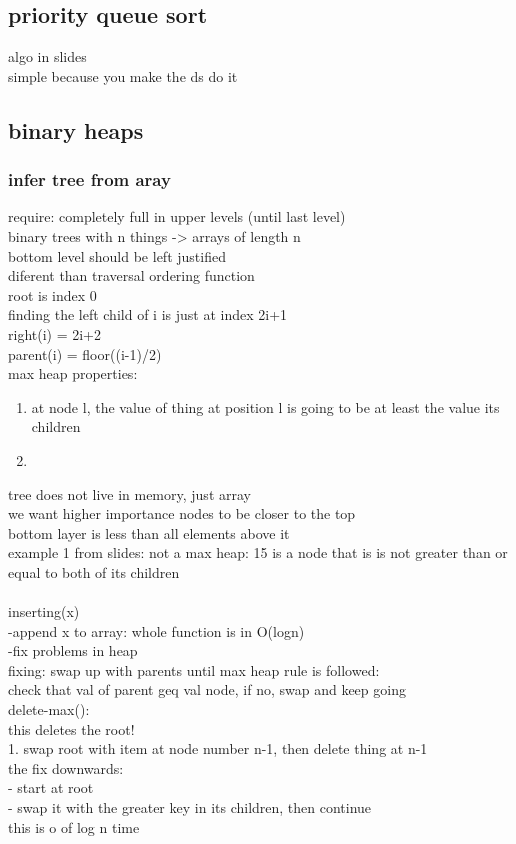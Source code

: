 \documentclass{article}
\begin{document}
\subsection{priority queue sort}
algo in slides\\
simple because you make the ds do it\\
\subsection{binary heaps}
\subsubsection{infer tree from aray}
require: completely full in upper levels (until last level)\\
binary trees with n things -> arrays of length n\\
bottom level should be left justified\\
diferent than traversal ordering function\\
root is index 0\\
finding the left child of i is just at index 2i+1\\
right(i) = 2i+2\\
parent(i) = floor((i-1)/2)\\
max heap properties:
\begin{enumerate}
    \item at node l, the value of thing at position l is going to be at least the value its children\\
    \item 
\end{enumerate}
tree does not live in memory, just array\\
we want higher importance nodes to be closer to the top\\
bottom layer is less than all elements above it\\
example 1 from slides: not a max heap: 15 is a node that is is not greater than or equal to both of its children\\
\\
inserting(x)\\
-append x to array: whole function is in O(logn)\\
-fix problems in heap\\
fixing: swap up with parents until max heap rule is followed:\\
check that val of parent geq val node, if no, swap and keep going\\
delete-max():\\
this deletes the root! \\
1. swap root with item at node number n-1, then delete thing at n-1\\
the fix downwards:\\
- start at root\\
- swap it with the greater key in its children, then continue\\
this is o of log n time
\end{document}
